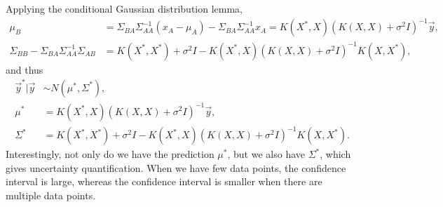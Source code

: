 Applying the conditional Gaussian distribution lemma,
\begin{equation*} \label{eq1}
	\begin{split}
		\mu_B & = \Sigma_{BA} \Sigma_{AA}^{-1} (x_A - \mu_A) - \Sigma_{BA} \Sigma_{AA}^{-1} x_A = K(X^*, X) (K(X, X) + \sigma^2 I)^{-1} \overrightarrow{y},\\
		\Sigma_{BB} - \Sigma_{BA}\Sigma_{AA}^{-1} \Sigma_{AB} 
		& = K(X^*, X^*) + \sigma^2 I - K(X^*, X)(K(X, X) + \sigma^2 I)^{-1} K(X, X^*),
	\end{split}
\end{equation*}
and thus
\begin{equation} \label{eq1}
	\begin{split}
		\overrightarrow{y}^* | \overrightarrow{y} & \sim N(\mu^*, \Sigma^*),\\
		\mu^* & = K(X^*, X)(K(X, X) + \sigma^2 I)^{-1} \overrightarrow{y},\\
		\Sigma^* & = K(X^*, X^*) + \sigma^2 I - K(X^*, X)(K(X, X) + \sigma^2 I)^{-1} K(X, X^*).
	\end{split}
\end{equation}
Interestingly, not only do we have the prediction $\mu^*$, but we also have $\Sigma^*$, which gives uncertainty quantification. When we have few data points, the confidence interval is large, whereas the confidence interval is smaller when there are multiple data points.